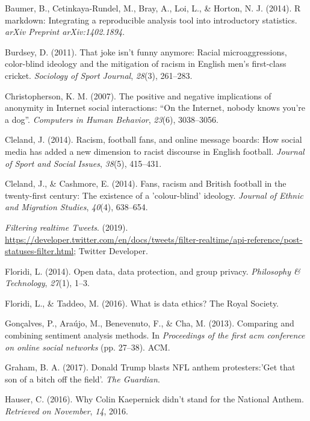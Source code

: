 \documentclass[12pt,twoside]{reedthesis}
\begin{document}
\hypertarget{ref-baumer2014r}{}
Baumer, B., Cetinkaya-Rundel, M., Bray, A., Loi, L., \& Horton, N. J.
(2014). R markdown: Integrating a reproducible analysis tool into
introductory statistics. \emph{arXiv Preprint arXiv:1402.1894}.

\hypertarget{ref-burdsey2011joke}{}
Burdsey, D. (2011). That joke isn't funny anymore: Racial
microaggressions, color-blind ideology and the mitigation of racism in
English men's first-class cricket. \emph{Sociology of Sport Journal},
\emph{28}(3), 261--283.

\hypertarget{ref-christopherson2007positive}{}
Christopherson, K. M. (2007). The positive and negative implications of
anonymity in Internet social interactions: ``On the Internet, nobody
knows you're a dog''. \emph{Computers in Human Behavior}, \emph{23}(6),
3038--3056.

\hypertarget{ref-cleland2014racism}{}
Cleland, J. (2014). Racism, football fans, and online message boards:
How social media has added a new dimension to racist discourse in
English football. \emph{Journal of Sport and Social Issues},
\emph{38}(5), 415--431.

\hypertarget{ref-cleland2014fans}{}
Cleland, J., \& Cashmore, E. (2014). Fans, racism and British football
in the twenty-first century: The existence of a 'colour-blind' ideology.
\emph{Journal of Ethnic and Migration Studies}, \emph{40}(4), 638--654.

\hypertarget{ref-streamingapi}{}
\emph{Filtering realtime Tweets}. (2019).
\url{https://developer.twitter.com/en/docs/tweets/filter-realtime/api-reference/post-statuses-filter.html};
Twitter Developer.

\hypertarget{ref-floridi2014open}{}
Floridi, L. (2014). Open data, data protection, and group privacy.
\emph{Philosophy \& Technology}, \emph{27}(1), 1--3.

\hypertarget{ref-floridi2016data}{}
Floridi, L., \& Taddeo, M. (2016). What is data ethics? The Royal
Society.

\hypertarget{ref-gonccalves2013comparing}{}
Gonçalves, P., Araújo, M., Benevenuto, F., \& Cha, M. (2013). Comparing
and combining sentiment analysis methods. In \emph{Proceedings of the
first acm conference on online social networks} (pp. 27--38). ACM.

\hypertarget{ref-graham2017donald}{}
Graham, B. A. (2017). Donald Trump blasts NFL anthem protesters:'Get
that son of a bitch off the field'. \emph{The Guardian}.

\hypertarget{ref-hauser2016colin}{}
Hauser, C. (2016). Why Colin Kaepernick didn't stand for the National
Anthem. \emph{Retrieved on November}, \emph{14}, 2016.
\end{document}
